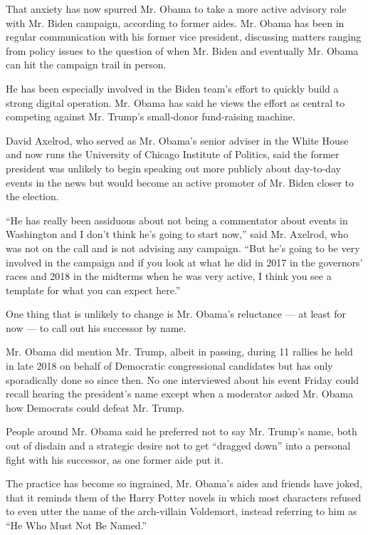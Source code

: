 That anxiety has now spurred Mr. Obama to take a more active advisory
role with Mr. Biden campaign, according to former aides. Mr. Obama has
been in regular communication with his former vice president, discussing
matters ranging from policy issues to the question of when Mr. Biden and
eventually Mr. Obama can hit the campaign trail in person.

He has been especially involved in the Biden team's effort to quickly
build a strong digital operation. Mr. Obama has said he views the effort
as central to competing against Mr. Trump's small-donor fund-raising
machine.

David Axelrod, who served as Mr. Obama's senior adviser in the White
House and now runs the University of Chicago Institute of Politics, said
the former president was unlikely to begin speaking out more publicly
about day-to-day events in the news but would become an active promoter
of Mr. Biden closer to the election.

``He has really been assiduous about not being a commentator about
events in Washington and I don't think he's going to start now,'' said
Mr. Axelrod, who was not on the call and is not advising any campaign.
``But he's going to be very involved in the campaign and if you look at
what he did in 2017 in the governors' races and 2018 in the midterms
when he was very active, I think you see a template for what you can
expect here.''

One thing that is unlikely to change is Mr. Obama's reluctance --- at
least for now --- to call out his successor by name.

Mr. Obama did mention Mr. Trump, albeit in passing, during 11 rallies he
held in late 2018 on behalf of Democratic congressional candidates but
has only sporadically done so since then. No one interviewed about his
event Friday could recall hearing the president's name except when a
moderator asked Mr. Obama how Democrats could defeat Mr. Trump.

People around Mr. Obama said he preferred not to say Mr. Trump's name,
both out of disdain and a strategic desire not to get ``dragged down''
into a personal fight with his successor, as one former aide put it.

The practice has become so ingrained, Mr. Obama's aides and friends have
joked, that it reminds them of the Harry Potter novels in which most
characters refused to even utter the name of the arch-villain Voldemort,
instead referring to him as ``He Who Must Not Be Named.''


